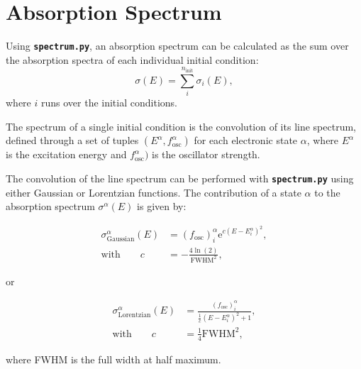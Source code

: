 \documentclass[a4paper,11pt,DIV=15,openany,twoside=false]{scrbook}
\newcommand{\ttmdump}[1]{#1}
\newcommand{\ttt}[1]{\textbf{\texttt{#1}}}
\newcommand{\E}{\ensuremath{\mathrm{e}}}
\begin{document}
\section{Absorption Spectrum}\label{met:spectrum}

Using \ttt{spectrum.py}, an absorption spectrum can be calculated as the sum over the absorption spectra of each individual initial condition:
\begin{equation}
  \sigma(E)=\sum\limits_i^{n_\text{init}} \sigma_i(E),
\end{equation}
where $i$ runs over the initial conditions.

The spectrum of a single initial condition is the convolution of its line spectrum, defined through a set of tuples $(E^\alpha,f_\text{osc}^\alpha)$ for each electronic state $\alpha$, where $E^\alpha$ is the excitation energy and $f_\text{osc}^\alpha)$ is the oscillator strength.

The convolution of the line spectrum can be performed with \ttt{spectrum.py} using either Gaussian or Lorentzian functions. The contribution of a state $\alpha$ to the absorption spectrum $\sigma^\alpha(E)$ is given by:
\ttmdump{
  \begin{align}
    \sigma_{\text{Gaussian}}^\alpha(E)&=
    \left(f_{\text{osc}}\right)_i^\alpha 
    \E^{c\left(E-E_i^\alpha\right)^2},\\
    \text{with}\qquad
    c&=-\frac{4\ln(2)}{\text{FWHM}^2},
  \end{align}
}
or
\ttmdump{
  \begin{align}
    \sigma_{\text{Lorentzian}}^\alpha(E)&=
    \frac{\left(f_{\text{osc}}\right)_i^\alpha}{\frac{1}{c}\left(E-E_i^\alpha\right)^2+1},\\
    \text{with}\qquad
    c&=\frac{1}{4}\text{FWHM}^2,
  \end{align}
}
where FWHM is the full width at half maximum.
\end{document}
